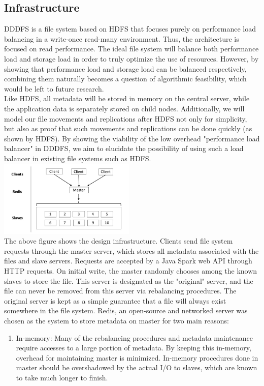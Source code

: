 \documentclass[twoside]{article}
\begin{document}
\begin{multicols}{2}
\subsection*{Infrastructure}
DDDFS is a file system based on HDFS that focuses purely on performance load balancing in a write-once read-many environment. Thus, the architecture is focused on read performance. The ideal file system will balance both performance load and storage load in order to truly optimize the use of resources. However, by showing that performance load and storage load can be balanced respectively, combining them naturally becomes a question of algorithmic feasibility, which would be left to future research.\\\indent
Like HDFS, all metadata will be stored in memory on the central server, while the application data is separately stored on child nodes. Additionally, we will model our file movements and replications after HDFS not only for simplicity, but also as proof that such movements and replications can be done quickly (as shown by HDFS). By showing the viability of the low overhead "performance load balancer" in DDDFS, we aim to elucidate the possibility of using such a load balancer in existing file systems such as HDFS.
\includegraphics[width=6.5cm]{res/server_diagram.jpg}\\\indent
The above figure shows the design infrastructure. Clients send file system requests through the master server, which stores all metadata associated with the files and slave servers. Requests are accepted by a Java Spark web API through HTTP requests. On initial write, the master randomly chooses among the known slaves to store the file. This server is designated as the "original" server, and the file can never be removed from this server via rebalancing procedures. The original server is kept as a simple guarantee that a file will always exist somewhere in the file system. Redis, an open-source and networked server was chosen as the system to store metadata on master for two main reasons:
\begin{enumerate}
	\item In-memory: Many of the rebalancing procedures and metadata maintenance require accesses to a large portion of metadata. By keeping this in-memory, overhead for maintaining master is minimized. In-memory procedures done in master should be overshadowed by the actual I/O to slaves, which are known to take much longer to finish. 

\end{enumerate}
\end{multicols}
\end{document}
